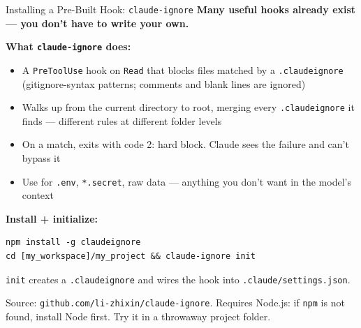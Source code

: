 \documentclass[aspectratio=169, 11pt]{beamer}
\begin{document}
\begin{frame}[fragile]{Installing a Pre-Built Hook: \texttt{claude-ignore}}
  \textbf{Many useful hooks already exist --- you don't have to write your own.}

  \vspace{0.3em}
  \textbf{What \texttt{claude-ignore} does:}
  \begin{itemize}\small
    \item A \texttt{PreToolUse} hook on \texttt{Read} that blocks files matched by a \texttt{.claudeignore} (gitignore-syntax patterns; comments and blank lines are ignored)
    \item Walks up from the current directory to root, merging every \texttt{.claudeignore} it finds --- different rules at different folder levels
    \item On a match, exits with code 2: hard block. Claude sees the failure and can't bypass it
    \item Use for \texttt{.env}, \texttt{*.secret}, raw data --- anything you don't want in the model's context
  \end{itemize}

  \vspace{0.3em}
  \textbf{Install + initialize:}
\begin{lstlisting}[basicstyle=\ttfamily\small]
npm install -g claudeignore
cd [my_workspace]/my_project && claude-ignore init
  \end{lstlisting}

  \vspace{0.2em}
  \texttt{init} creates a \texttt{.claudeignore} and wires the hook into \texttt{.claude/settings.json}.

  \vspace{0.2em}
  \alert{\small Source: \texttt{github.com/li-zhixin/claude-ignore}. Requires Node.js: if \texttt{npm} is not found, install Node first. Try it in a throwaway project folder.}
\end{frame}
\end{document}
